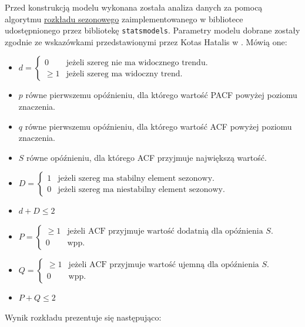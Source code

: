 \documentclass[12pt]{article}
\begin{document}
Przed konstrukcją modelu wykonana została analiza danych za pomocą algorytmu \href{https://www.statsmodels.org/stable/generated/statsmodels.tsa.seasonal.seasonal_decompose.html}{rozkładu sezonowego} zaimplementowanego w bibliotece  udostępnionego przez bibliotekę \texttt{statsmodels}. Parametry modelu dobrane zostały zgodnie ze wskazówkami przedstawionymi przez Kotas Hatalis w \cite{A}. Mówią one:
\begin{itemize}
    \item $d = \begin{cases}
                  0      & \text{jeżeli szereg nie ma widocznego trendu.} \\
                  \geq 1 & \text{jeżeli szereg ma widoczny trend.}
              \end{cases}$
    \item $p$ równe pierwszemu opóźnieniu, dla którego wartość PACF powyżej poziomu znaczenia.
    \item $q$ równe pierwszemu opóźnieniu, dla którego wartość ACF powyżej poziomu znaczenia.
    \item $S$ równe opóźnieniu, dla którego ACF przyjmuje największą wartość.
    \item $D = \begin{cases}
                  1 & \text{jeżeli szereg ma stabilny element sezonowy.}    \\
                  0 & \text{jeżeli szereg ma niestabilny element sezonowy.}
              \end{cases}$
    \item $d + D \leq 2$
    \item $P = \begin{cases}
                  \geq 1 & \text{jeżeli ACF przyjmuje wartość dodatnią dla opóźnienia $S$.} \\
                  0      & \text{wpp.}
              \end{cases}$
    \item $Q = \begin{cases}
                  \geq 1 & \text{jeżeli ACF przyjmuje wartość ujemną dla opóźnienia $S$.} \\
                  0      & \text{wpp.}
              \end{cases}$
    \item $P + Q \leq 2$
\end{itemize}

Wynik rozkładu prezentuje się następująco:
\end{document}
